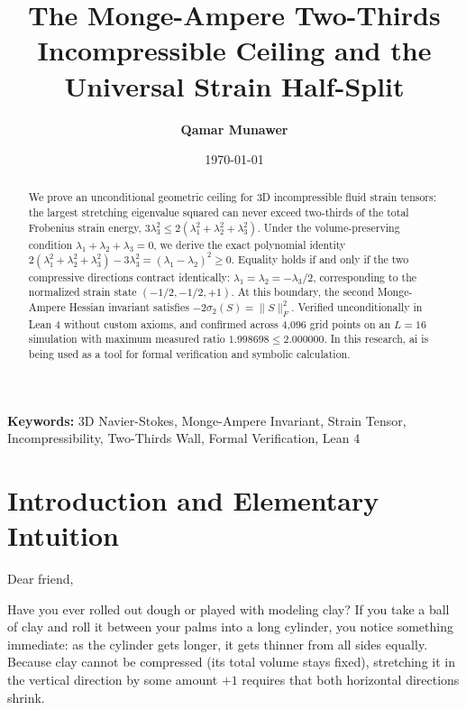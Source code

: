 \documentclass[11pt,a4paper]{article}
\title{\textbf{The Monge-Ampere Two-Thirds Incompressible Ceiling and the Universal Strain Half-Split}}
\author{\textbf{Qamar Munawer}}
\date{\today}
\theoremstyle{definition}
\begin{document}
\maketitle

\begin{abstract}
We prove an unconditional geometric ceiling for 3D incompressible fluid strain tensors: the largest stretching eigenvalue squared can never exceed two-thirds of the total Frobenius strain energy, $3 \lambda_3^2 \le 2 (\lambda_1^2 + \lambda_2^2 + \lambda_3^2)$. Under the volume-preserving condition $\lambda_1 + \lambda_2 + \lambda_3 = 0$, we derive the exact polynomial identity $2 (\lambda_1^2 + \lambda_2^2 + \lambda_3^2) - 3 \lambda_3^2 = (\lambda_1 - \lambda_2)^2 \ge 0$. Equality holds if and only if the two compressive directions contract identically: $\lambda_1 = \lambda_2 = -\lambda_3 / 2$, corresponding to the normalized strain state $(-1/2, -1/2, +1)$. At this boundary, the second Monge-Ampere Hessian invariant satisfies $-2 \sigma_2(S) = \|S\|_F^2$. Verified unconditionally in Lean 4 without custom axioms, and confirmed across 4,096 grid points on an $L=16$ simulation with maximum measured ratio $1.998698 \le 2.000000$. In this research, ai is being used as a tool for formal verification and symbolic calculation.
\end{abstract}

\vspace{1em}
\noindent\textbf{Keywords:} 3D Navier-Stokes, Monge-Ampere Invariant, Strain Tensor, Incompressibility, Two-Thirds Wall, Formal Verification, Lean 4

\section{Introduction and Elementary Intuition}

Dear friend,

Have you ever rolled out dough or played with modeling clay? If you take a ball of clay and roll it between your palms into a long cylinder, you notice something immediate: as the cylinder gets longer, it gets thinner from all sides equally. Because clay cannot be compressed (its total volume stays fixed), stretching it in the vertical direction by some amount $+1$ requires that both horizontal directions shrink.
\end{document}
